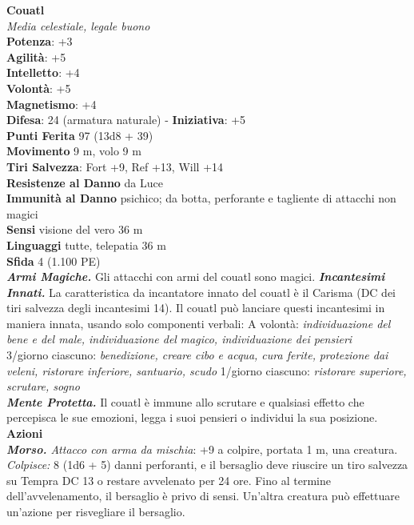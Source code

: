 \begin{multicols}{2}
\medskip\textbf{Couatl}\\
\emph{Media celestiale, legale buono}\\
\textbf{Potenza}: +3\\
\textbf{Agilità}: +5\\
\textbf{Intelletto}: +4\\
\textbf{Volontà}: +5\\
\textbf{Magnetismo}: +4\\
\textbf{Difesa}: 24 (armatura naturale) - \textbf{Iniziativa}: +5\\
\textbf{Punti Ferita} 97 (13d8 + 39)\\
\textbf{Movimento} 9 m, volo 9 m\\
\textbf{Tiri Salvezza}: Fort +9, Ref +13, Will +14\\
\textbf{Resistenze al Danno} da Luce\\
\textbf{Immunità al Danno} psichico; da botta, perforante e tagliente di attacchi non magici\\
\textbf{Sensi} visione del vero 36 m\\
\textbf{Linguaggi} tutte, telepatia 36 m \\
\textbf{Sfida} 4 (1.100 PE)\smallskip\\
\emph{\textbf{Armi Magiche.}} Gli attacchi con armi del couatl sono magici.
\emph{\textbf{Incantesimi Innati.}} La caratteristica da incantatore innato del couatl è il Carisma (DC dei tiri salvezza degli incantesimi 14). Il couatl può lanciare questi incantesimi in maniera innata, usando solo componenti verbali:
A volontà: \emph{individuazione del bene e del male, individuazione del} \emph{magico, individuazione dei pensieri}\\
3/giorno ciascuno: \emph{benedizione, creare cibo e acqua, cura ferite,} \emph{protezione dai veleni, ristorare inferiore, santuario, scudo} 1/giorno ciascuno: \emph{ristorare superiore, scrutare, sogno}\\
\emph{\textbf{Mente Protetta.}} Il couatl è immune allo scrutare e qualsiasi effetto che percepisca le sue emozioni, legga i suoi pensieri o individui la sua posizione.\\
\smallskip\textbf{Azioni}\\
\emph{\textbf{Morso.} Attacco con arma da mischia}: +9 a colpire, portata 1 m, una creatura.\\
\emph{Colpisce:} 8 (1d6 + 5) danni perforanti, e il bersaglio deve riuscire un tiro salvezza su Tempra DC 13 o restare avvelenato per 24 ore. Fino al termine dell'avvelenamento, il bersaglio è privo di sensi. Un'altra creatura può effettuare un'azione per risvegliare il bersaglio.\\


\end{multicols}
